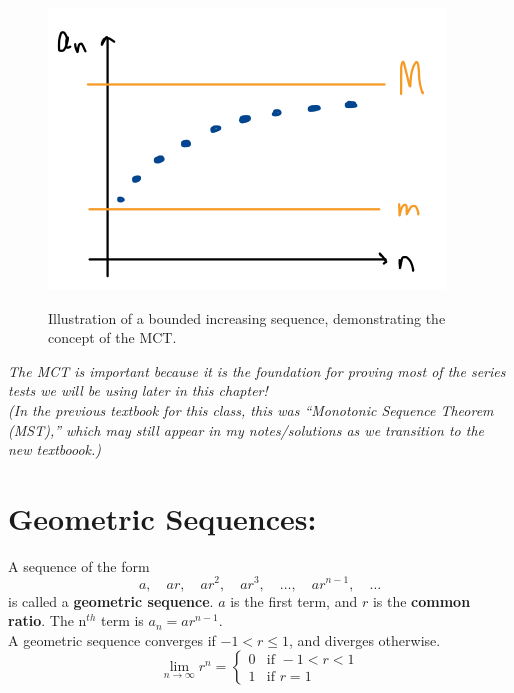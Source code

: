 \begin{figure}[!h]
\centering
\includegraphics[width=.75\columnwidth]{Ch8s1-MST.png}\\
\caption{Illustration of a bounded increasing sequence, demonstrating the concept of the MCT.}
\end{figure}

\textit{The MCT is important because it is the foundation for proving most of the series tests we will be using later in this chapter!}\\

\textit{(In the previous textbook for this class, this was ``Monotonic Sequence Theorem (MST),'' which may still appear in my notes/solutions as we transition to the new textboook.)}\\


\vspace*{.1in}

\section*{Geometric Sequences:}
 A sequence of the form
\[ a, \quad  ar, \quad  ar^2, \quad  ar^3, \quad  \ldots, \quad  ar^{n-1}, \quad \ldots\]
is called a \textbf{geometric sequence}. \(a\) is the first term, and \(r\) is the \textbf{common ratio}. The n\(^{th}\) term is \(a_n=ar^{n-1}\).\\

A geometric sequence converges if \(-1<r\leq 1\), and diverges otherwise.
\[
\lim_{n\rightarrow \infty} r^n = \left\lbrace\begin{matrix}
0 & \text{if } -1 < r < 1\\
1 & \text{if } r =1
\end{matrix}\right.
\]



